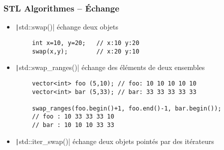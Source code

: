 \documentclass[C++.tex]{subfiles}
\begin{document}
\begin{frame}[fragile]
	\frametitle{STL Algorithmes -- Échange}
	\begin{itemize}
		\item \texttt|std::swap()| échange deux objets
	\end{itemize}

	\begin{verbatim}
		int x=10, y=20;   // x:10 y:20
		swap(x,y);        // x:20 y:10
	\end{verbatim}

	\begin{itemize}
		\item \texttt|std::swap_ranges()| échange des éléments de deux ensembles
	\end{itemize}

	\begin{verbatim}
		vector<int> foo (5,10); // foo: 10 10 10 10 10
		vector<int> bar (5,33); // bar: 33 33 33 33 33

		swap_ranges(foo.begin()+1, foo.end()-1, bar.begin());
		// foo : 10 33 33 33 10
		// bar : 10 10 10 33 33
	\end{verbatim}

	\begin{itemize}
		\item \texttt|std::iter_swap()| échange deux objets pointés par des itérateurs
	\end{itemize}

\end{frame}
\end{document}
